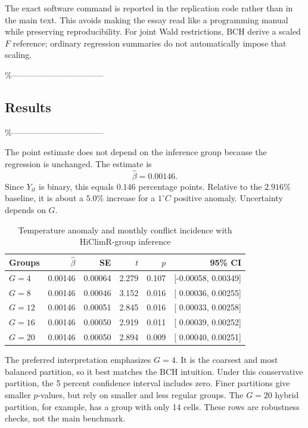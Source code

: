 \documentclass[
]{article}
\begin{document}
The exact software command is reported in the replication code rather
than in the main text. This avoids making the essay read like a
programming manual while preserving reproducibility. For joint Wald
restrictions, BCH derive a scaled \(F\) reference; ordinary regression
summaries do not automatically impose that scaling.

\%---------------------------------

\subsection{Results}

\%---------------------------------

The point estimate does not depend on the inference group because the
regression is unchanged. The estimate is \[
\widehat\beta=0.00146.
\] Since \(Y_{it}\) is binary, this equals \(0.146\) percentage points.
Relative to the \(2.916\%\) baseline, it is about a \(5.0\%\) increase
for a \(1^\circ C\) positive anomaly. Uncertainty depends on \(G\).

\begin{table}[H]
\centering
\caption{Temperature anomaly and monthly conflict incidence with HiClimR-group inference}
\label{tab:bch-results}
\begin{tabular}{lrrrrr}
\toprule
Groups & \(\widehat\beta\) & SE & \(t\) & \(p\) & 95\% CI\\
\midrule
\(G=4\)  & 0.00146 & 0.00064 & 2.279 & 0.107 & [-0.00058, 0.00349]\\
\(G=8\)  & 0.00146 & 0.00046 & 3.152 & 0.016 & [ 0.00036, 0.00255]\\
\(G=12\) & 0.00146 & 0.00051 & 2.845 & 0.016 & [ 0.00033, 0.00258]\\
\(G=16\) & 0.00146 & 0.00050 & 2.919 & 0.011 & [ 0.00039, 0.00252]\\
\(G=20\) & 0.00146 & 0.00050 & 2.894 & 0.009 & [ 0.00040, 0.00251]\\
\bottomrule
\end{tabular}
\end{table}

The preferred interpretation emphasizes \(G=4\). It is the coarsest and
most balanced partition, so it best matches the BCH intuition. Under
this conservative partition, the 5 percent confidence interval includes
zero. Finer partitions give smaller \(p\)-values, but rely on smaller
and less regular groups. The \(G=20\) hybrid partition, for example, has
a group with only 14 cells. These rows are robustness checks, not the
main benchmark.
\end{document}
